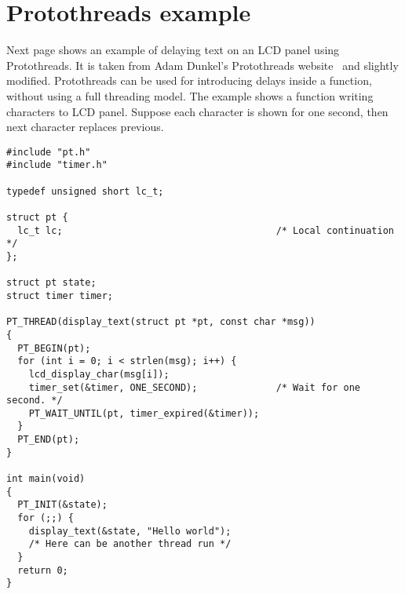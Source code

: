 

\chapter{Protothreads example}\label{app:protothreads}
Next page shows
an example of delaying text on an LCD panel using Protothreads.
It is taken from
Adam Dunkel's Protothreads website~\cite{adam-protothreads} and slightly modified.
Protothreads can be used for introducing delays inside a function, without using a full threading model.
The example shows a function writing characters to LCD panel.
Suppose each character is shown for one second, then next character replaces previous.

\newpage

\begin{lstlisting}
#include "pt.h"
#include "timer.h"

typedef unsigned short lc_t;

struct pt {
  lc_t lc;                                      /* Local continuation */
}; 

struct pt state;
struct timer timer;
 
PT_THREAD(display_text(struct pt *pt, const char *msg))
{
  PT_BEGIN(pt);
  for (int i = 0; i < strlen(msg); i++) {
    lcd_display_char(msg[i]);
    timer_set(&timer, ONE_SECOND);              /* Wait for one second. */
    PT_WAIT_UNTIL(pt, timer_expired(&timer));
  }
  PT_END(pt);
}

int main(void)
{
  PT_INIT(&state);
  for (;;) {
    display_text(&state, "Hello world");
    /* Here can be another thread run */
  }
  return 0;
}

\end{lstlisting}

